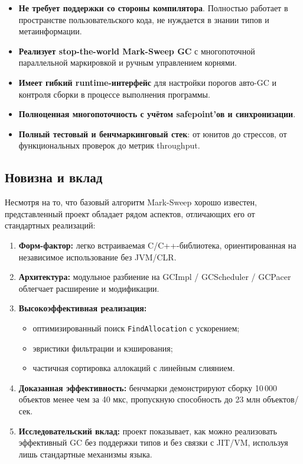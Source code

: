 \begin{itemize}
    \item \textbf{Не требует поддержки со стороны компилятора}. Полностью работает в пространстве пользовательского кода, не нуждается в знании типов и метаинформации.
    \item \textbf{Реализует stop-the-world Mark-Sweep GC} с многопоточной параллельной маркировкой и ручным управлением корнями.
    \item \textbf{Имеет гибкий runtime-интерфейс} для настройки порогов авто-GC и контроля сборки в процессе выполнения программы.
    \item \textbf{Полноценная многопоточность с учётом safepoint'ов и синхронизации}.
    \item \textbf{Полный тестовый и бенчмаркинговый стек}: от юнитов до стрессов, от функциональных проверок до метрик throughput.
\end{itemize}

\subsection{Новизна и вклад}

Несмотря на то, что базовый алгоритм Mark-Sweep хорошо известен, представленный проект обладает рядом аспектов, отличающих его от стандартных реализаций:

\begin{enumerate}[label=\arabic*.]
    \item \textbf{Форм-фактор:} легко встраиваемая C/C++-библиотека, ориентированная на независимое использование без JVM/CLR.
    \item \textbf{Архитектура:} модульное разбиение на GCImpl / GCScheduler / GCPacer облегчает расширение и модификации.
    \item \textbf{Высокоэффективная реализация:}
    \begin{itemize}
        \item оптимизированный поиск \texttt{FindAllocation} с ускорением;
        \item эвристики фильтрации и кэширования;
        \item частичная сортировка аллокаций с линейным слиянием.
    \end{itemize}
    \item \textbf{Доказанная эффективность:} бенчмарки демонстрируют сборку 10\,000 объектов менее чем за 40 мкс, пропускную способность до 23 млн объектов/сек.
    \item \textbf{Исследовательский вклад:} проект показывает, как можно реализовать эффективный GC без поддержки типов и без связки с JIT/VM, используя лишь стандартные механизмы языка.
\end{enumerate}

